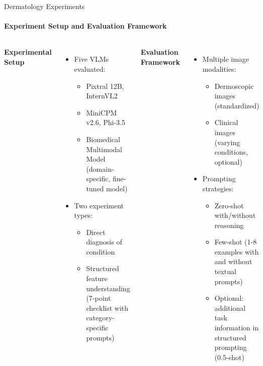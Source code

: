\begin{frame}{Dermatology Experiments}
\framesubtitle{Experiment Setup and Evaluation Framework}
  \vspace{-1em}
  \begin{columns}[T]
    \column{\customcolumnwidth}
      \textbf{Experimental Setup}
      \begin{itemize}
        \item Five VLMs evaluated:
        \begin{itemize}
          \item Pixtral 12B, InternVL2
          \item MiniCPM v2.6, Phi-3.5
          \item Biomedical Multimodal Model (domain-specific, fine-tuned model)
        \end{itemize}
        \item Two experiment types:
        \begin{itemize}
          \item Direct diagnosis of condition
          \item Structured feature understanding (7-point checklist with category-specific prompts)
        \end{itemize}
      \end{itemize}
    \column{\customcolumnwidth}
      \textbf{Evaluation Framework}
      \begin{itemize}
        \item Multiple image modalities:
        \begin{itemize}
          \item Dermoscopic images (standardized)
          \item Clinical images (varying conditions, optional)
        \end{itemize}
        \item Prompting strategies:
        \begin{itemize}
          \item Zero-shot with/without reasoning
          \item Few-shot (1-8 examples with and without textual prompts)
          \item Optional: additional task information in structured prompting (0.5-shot)
        \end{itemize}
      \end{itemize}
    \end{columns}
\end{frame}

